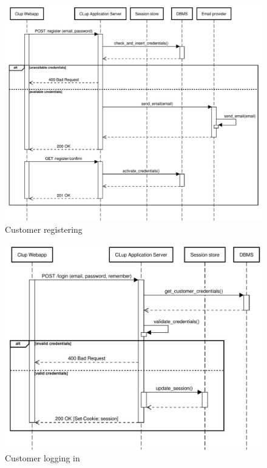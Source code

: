 \begin{figure}[H]
    \centering
    \includegraphics[width=1\textwidth]{Images/runtime_registration.pdf}
    \caption{Customer registering}
\end{figure}
\begin{figure}[H]
    \centering
    \includegraphics[width=1\textwidth]{Images/runtime_login.pdf}
    \caption{Customer logging in}
\end{figure}
